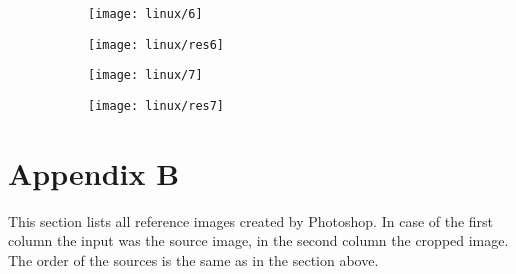 \documentclass[draft,final]{vutinfth} %
\begin{document}
\begin{appendices}
\begin{figure}[H]
		\end{figure}   
		\begin{figure}[H]
			\centering
			\begin{subfigure}[b]{0.45\columnwidth}
				\centering
				\texttt{[image: linux/6]}
			\end{subfigure}
			\begin{subfigure}[b]{0.45\columnwidth}
				\centering
				\texttt{[image: linux/res6]}
			\end{subfigure}
		\end{figure}  
			\begin{figure}[H]
			\centering
			\begin{subfigure}[b]{0.45\columnwidth}
				\centering
				\texttt{[image: linux/7]}
			\end{subfigure}
			\begin{subfigure}[b]{0.45\columnwidth}
				\centering
				\texttt{[image: linux/res7]}
			\end{subfigure}
		\end{figure}  		 
		\chapter{Appendix B}
		\label{AppB}
		This section lists all reference images created by Photoshop.
		In case of the first column the input was the source image, in the second column the cropped image.
		The order of the sources is the same as in the section above.
		

\end{appendices}
\end{document}
